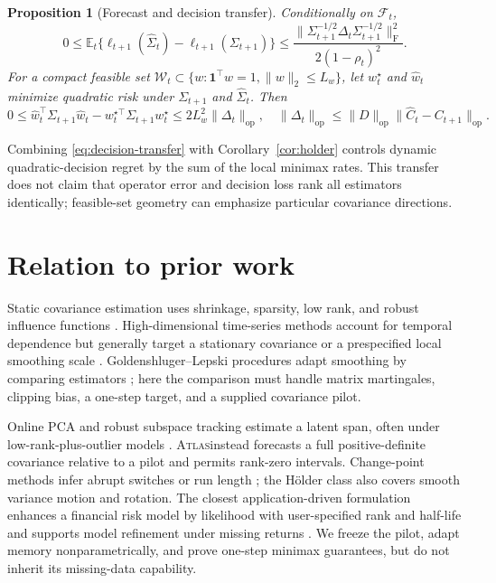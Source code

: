\documentclass{article}
\newtheorem{proposition}[theorem]{Proposition}
\theoremstyle{definition}
\theoremstyle{remark}
\newcommand{\E}{\mathbb{E}}
\newcommand{\F}{\mathcal{F}}
\newcommand{\W}{\mathcal{W}}
\newcommand{\op}{\mathrm{op}}
\newcommand{\fro}{\mathrm{F}}
\newcommand{\ATLAS}{\textsc{Atlas}}
\newcommand{\one}{\bm 1}
\begin{document}
\begin{proposition}[Forecast and decision transfer]
\label{prop:decision}
Conditionally on $\F_t$,
\begin{equation}
 0\le\E_t\{\ell_{t+1}(\widehat\Sigma_t)-\ell_{t+1}(\Sigma_{t+1})\}
 \le\frac{\|\Sigma_{t+1}^{-1/2}\Delta_t\Sigma_{t+1}^{-1/2}\|_{\fro}^2}{2(1-\rho_t)^2}.
 \label{eq:nll-transfer}
\end{equation}
For a compact feasible set $\W_t\subset\{w:\one^\top w=1,\|w\|_2\le L_w\}$, let $w_t^\star$ and $\widehat w_t$ minimize quadratic risk under $\Sigma_{t+1}$ and $\widehat\Sigma_t$. Then
\begin{equation}
 0\le\widehat w_t^\top\Sigma_{t+1}\widehat w_t-w_t^{\star\top}\Sigma_{t+1}w_t^\star
 \le2L_w^2\|\Delta_t\|_{\op},
 \quad
 \|\Delta_t\|_{\op}\le\|D\|_{\op}\|\widehat C_t-C_{t+1}\|_{\op}.
 \label{eq:decision-transfer}
\end{equation}
\end{proposition}

Combining \eqref{eq:decision-transfer} with Corollary~\ref{cor:holder} controls dynamic quadratic-decision regret by the sum of the local minimax rates. This transfer does not claim that operator error and decision loss rank all estimators identically; feasible-set geometry can emphasize particular covariance directions.

\section{Relation to prior work}
\label{sec:related}

Static covariance estimation uses shrinkage, sparsity, low rank, and robust influence functions \citep{ledoit2004,cai2012,fan2013,minsker2018,ke2019}. High-dimensional time-series methods account for temporal dependence but generally target a stationary covariance or a prespecified local smoothing scale \citep{chen2013}. Goldenshluger--Lepski procedures adapt smoothing by comparing estimators \citep{goldenshluger2011}; here the comparison must handle matrix martingales, clipping bias, a one-step target, and a supplied covariance pilot.

Online PCA and robust subspace tracking estimate a latent span, often under low-rank-plus-outlier models \citep{brand2002,balzano2010,narayanamurthy2018,zhu2022}. \ATLAS instead forecasts a full positive-definite covariance relative to a pilot and permits rank-zero intervals. Change-point methods infer abrupt switches or run length \citep{adams2007,altamirano2023,puchkin2023}; the H\"older class also covers smooth variance motion and rotation. The closest application-driven formulation enhances a financial risk model by likelihood with user-specified rank and half-life and supports model refinement under missing returns \citep{tzikas2026}. We freeze the pilot, adapt memory nonparametrically, and prove one-step minimax guarantees, but do not inherit its missing-data capability.
\end{document}
